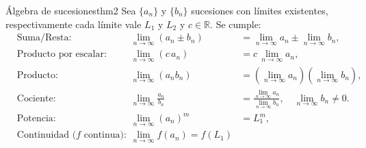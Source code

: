 \documentclass[12pt,a4paper]{article}
\begin{document}
\begin{teorema}{Álgebra de sucesiones}{thm2}
    Sea $\{a_n\}$ y $\{b_n\}$ sucesiones con límites existentes, respectivamente cada límite vale $L_1$ y $L_2$ y $c\in\mathbb{R}$. Se cumple:
    \[
    \begin{aligned}
    &\text{Suma/Resta:} & \lim_{n \to \infty} (a_n \pm b_n) &= \lim_{n \to \infty} a_n \pm \lim_{n \to \infty} b_n,\\
    &\text{Producto por escalar:} & \lim_{n \to \infty} (c\,a_n) &= c\,\lim_{n \to \infty} a_n,\\
    &\text{Producto:} & \lim_{n \to \infty} (a_n b_n) &= (\lim_{n \to \infty} a_n)(\lim_{n \to \infty} b_n),\\
    &\text{Cociente:} & \lim_{n \to \infty} \frac{a_n}{b_n} &= \frac{\lim\limits_{n \to \infty} a_n}{\lim\limits_{n \to \infty} b_n}, \quad \lim_{n\to\infty} b_n \neq 0. \\
    &\text{Potencia:} & \lim_{n \to \infty} (a_n)^m &= L_1^m,\\
    &\text{Continuidad ($f$ continua): } & \lim_{n \to \infty}f(a_n) = f(L_1) \\
    \end{aligned}
    \]
\end{teorema}
\end{document}

